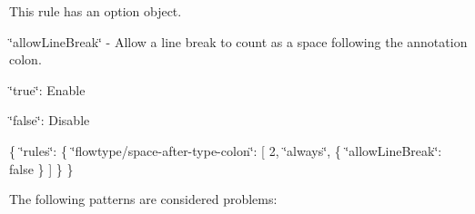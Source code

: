 This rule has an option object.


\begin{DoxyItemize}
\item {\ttfamily \char`\"{}allow\+Line\+Break\char`\"{}} -\/ Allow a line break to count as a space following the annotation colon.
\begin{DoxyItemize}
\item {\ttfamily \char`\"{}true\char`\"{}}\+: Enable
\item {\ttfamily \char`\"{}false\char`\"{}}\+: Disable
\end{DoxyItemize}
\end{DoxyItemize}

\{ \char`\"{}rules\char`\"{}\+: \{ \char`\"{}flowtype/space-\/after-\/type-\/colon\char`\"{}\+: \mbox{[} 2, \char`\"{}always\char`\"{}, \{ \char`\"{}allow\+Line\+Break\char`\"{}\+: false \} \mbox{]} \} \}

The following patterns are considered problems\+:


